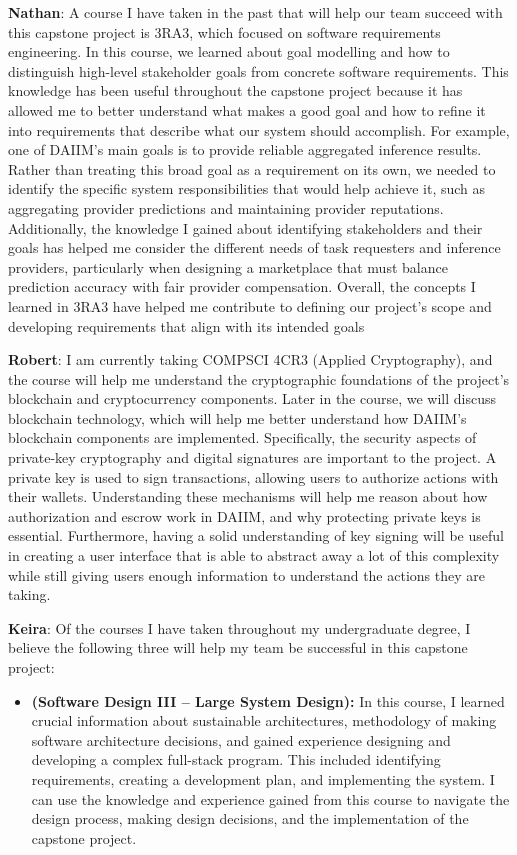 \documentclass[12pt]{article}
\begin{document}
\begin{enumerate}
  \textbf{Nathan}: A course I have taken in the past that will help our team succeed with this capstone project is 3RA3, which focused on software requirements engineering. In this course, we learned about goal modelling and how to distinguish high-level stakeholder goals from concrete software requirements. This knowledge has been useful throughout the capstone project because it has allowed me to better understand what makes a good goal and how to refine it into requirements that describe what our system should accomplish.
For example, one of DAIIM's main goals is to provide reliable aggregated inference results. Rather than treating this broad goal as a requirement on its own, we needed to identify the specific system responsibilities that would help achieve it, such as aggregating provider predictions and maintaining provider reputations. Additionally, the knowledge I gained about identifying stakeholders and their goals has helped me consider the different needs of task requesters and inference providers, particularly when designing a marketplace that must balance prediction accuracy with fair provider compensation. Overall, the concepts I learned in 3RA3 have helped me contribute to defining our project's scope and developing requirements that align with its intended goals


  \textbf{Robert}:
  I am currently taking COMPSCI 4CR3 (Applied Cryptography), and the course
  will help me understand the cryptographic foundations of the project's
  blockchain and cryptocurrency components. Later in the course, we will
  discuss blockchain technology, which will help me better understand how
  DAIIM's blockchain components are implemented. Specifically, the security
  aspects of private-key cryptography and digital signatures are important to
  the project. A private key is used to sign transactions, allowing users to
  authorize actions with their wallets. Understanding
  these mechanisms will help me reason about how authorization and escrow work
  in DAIIM, and why protecting private keys is essential. Furthermore, having
  a solid understanding of key signing will be useful in creating a user interface
  that is able to abstract away a lot of this complexity while still giving users
  enough information to understand the actions they are taking.

  \textbf{Keira}: 
  Of the courses I have taken throughout my undergraduate degree, I believe the following three will help my team be successful in this capstone project:
  \begin{itemize}
    \item \textbf{(Software Design III – Large System Design):} 
    In this course, I learned crucial information about sustainable architectures, methodology of making software architecture decisions, and gained experience designing and developing a complex full-stack program. This included identifying requirements, creating a development plan, and implementing the system. I can use the knowledge and experience gained from this course to navigate the design process, making design decisions, and the implementation of the capstone project.


\end{itemize}
\end{enumerate}
\end{document}

